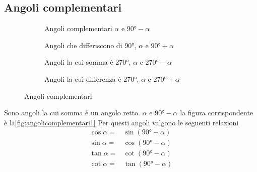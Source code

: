 \subsection{Angoli complementari}
\label{sub:AngoliComp}
\begin{figure}
	\begin{subfigure}[b]{.49\linewidth}
 	\centering
 	
 	\caption{Angoli complementari $\alpha$ e $\ang{90}-\alpha$}\label{fig:angolicomplementari1}
 \end{subfigure}
 	\begin{subfigure}[b]{.49\linewidth}
 		\centering
 		
 		\caption{Angoli che differiscono di $\ang{90}$, $\alpha$ e $\ang{90}+\alpha$}\label{fig:angolicomplementari2}
 	\end{subfigure}
 \begin{subfigure}[b]{.49\linewidth}
 		\centering
 		
 		\caption{Angoli la cui somma è $\ang{270}$, $\alpha$ e $\ang{270}-\alpha$}\label{tab:angolicomplementari3}	
 	\end{subfigure}
	\begin{subfigure}[b]{.49\linewidth}
		\centering
		
		\caption{Angoli la cui differenza è $\ang{270}$, $\alpha$ e $\ang{270}+\alpha$}\label{tab:angolicomplementari4}	
	\end{subfigure}
	\caption{Angoli complementari}
	\label{fig:angolicomplementari}
\end{figure}
Sono angoli la cui somma è un angolo retto.  $\alpha$ e $\ang{90}-\alpha$ la figura corrispondente è la\nobs\vref{fig:angolicomplementari1}
%	
Per questi angoli valgono le seguenti relazioni
\begin{align*}
\cos\alpha=&{}\sin(\ang{90}-\alpha)\\
\sin\alpha=&{}\cos(\ang{90}-\alpha)\\
\tan\alpha=&{}\cot(\ang{90}-\alpha)\\
\cot\alpha=&{}\tan(\ang{90}-\alpha)
\end{align*}
